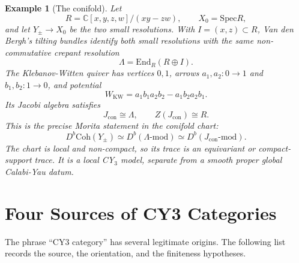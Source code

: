 \documentclass[11pt]{amsart}
\newtheorem{example}[theorem]{Example}
\newcommand{\Db}{D^{b}}
\newcommand{\Coh}{\mathrm{Coh}}
\newcommand{\End}{\mathrm{End}}
\newcommand{\Spec}{\mathrm{Spec}}
\newcommand{\bC}{\mathbb{C}}
\begin{document}
\begin{example}[The conifold]
Let
\[
  R=\bC[x,y,z,w]/(xy-zw),\qquad X_0=\Spec R,
\]
and let $Y_\pm\to X_0$ be the two small resolutions.  With
$I=(x,z)\subset R$, Van den Bergh's tilting bundles identify both
small resolutions with the same non-commutative crepant resolution
\[
  \Lambda=\End_R(R\oplus I).
\]
The Klebanov-Witten quiver has vertices $0,1$, arrows
$a_1,a_2\colon0\to1$ and $b_1,b_2\colon1\to0$, and potential
\[
  W_{\mathrm{KW}}=a_1b_1a_2b_2-a_1b_2a_2b_1.
\]
Its Jacobi algebra satisfies
\[
  J_{\mathrm{con}}\cong \Lambda,\qquad Z(J_{\mathrm{con}})\cong R.
\]
This is the precise Morita statement in the conifold chart:
\[
  \Db\Coh(Y_\pm)\simeq\Db(\Lambda\text{-}\mathrm{mod})
  \simeq\Db(J_{\mathrm{con}}\text{-}\mathrm{mod}).
\]
The chart is local and non-compact, so its trace is an equivariant or
compact-support trace.  It is a local CY$_3$ model, separate from a
smooth proper global Calabi-Yau datum.
\end{example}

\section{Four Sources of CY3 Categories}

The phrase ``CY3 category'' has several legitimate origins.  The
following list records the source, the orientation, and the finiteness
hypotheses.
\end{document}
